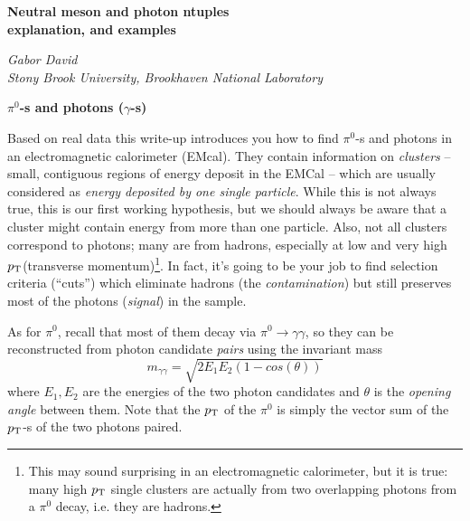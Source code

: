 \documentclass[12pt,letterpaper,aps,prc,superscriptaddress,showpacs,
longbibliography,nofootinbib,floatfix,onecolumn]{revtex4-1}
\newcommand{\pt}{\mbox{$p_{\rm T}$}\xspace}
\newcommand{\piz}{\mbox{$\pi^0$}\xspace}
\begin{document}
 

\begin{center}
{\bf Neutral meson and photon ntuples \\ 
 explanation, and examples}
\end{center}

\vspace{0.2in}

\begin{center}
{\it Gabor David \\
Stony Brook University, Brookhaven National Laboratory}
\end{center}

\vspace{0.3in}







{\bf $\pi^0$-s and photons ($\gamma$-s)} \\
\vspace{0.05in}

\noindent
Based on real data this write-up introduces you how to find $\pi^0$-s
and photons in an electromagnetic calorimeter (EMcal).  They contain
information on {\it clusters} -- small, contiguous regions of energy
deposit in the EMCal -- which are usually considered as 
{\it energy deposited by one single particle}.  While this is not
always true, this is our first working hypothesis, but we should
always be aware that a cluster might contain energy from more than one
particle.  Also, not all
clusters correspond to photons; many are from hadrons, especially at
low and very high \pt (transverse momentum)\footnote{This may sound
  surprising in an electromagnetic calorimeter, but it is true: many
  high \pt single clusters are actually from two overlapping photons
  from a \piz decay, i.e. they are hadrons.
}.  
In fact, it's going to
be your job to find selection criteria (``cuts'') which eliminate
hadrons (the {\it contamination}) but still preserves most of the
photons ({\it signal}) in the sample.

As for \piz, recall that most of them decay via 
$\pi^0 \rightarrow \gamma\gamma$, so they can be reconstructed from
photon candidate {\it pairs} using the invariant mass
$$ m_{\gamma\gamma} = \sqrt{2E_1E_2(1-cos(\theta))} $$
where $E_1,E_2$ are the energies of the two photon candidates and
$\theta$ is the {\it opening angle} between them.  Note that the \pt
of the \piz is simply the vector sum of the \pt-s of the two photons
paired. 
\end{document}
